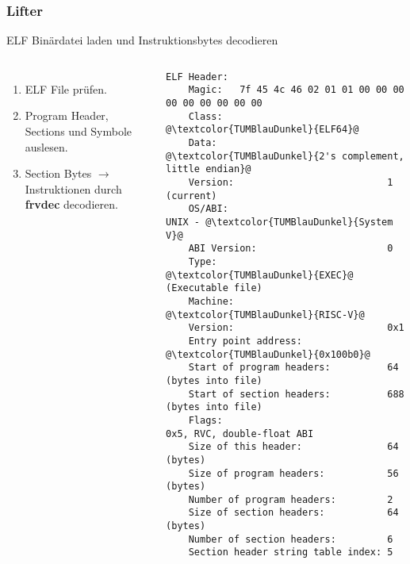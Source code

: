 
\begin{frame}[fragile]
    \frametitle{Lifter}{ELF Binärdatei laden und Instruktionsbytes decodieren}
    \begin{columns}[c]
        \pause{}
        \begin{enumerate}
            \item ELF File prüfen.
            \item Program Header, Sections und Symbole auslesen.
            \item Section Bytes $\rightarrow$ Instruktionen durch \textbf{frvdec} decodieren.
        \end{enumerate}
        \begin{lstlisting}[basicstyle=\footnotesize, breaklines=true, escapeinside={@@}]
ELF Header:
    Magic:   7f 45 4c 46 02 01 01 00 00 00 00 00 00 00 00 00
    Class:                             @\textcolor{TUMBlauDunkel}{ELF64}@
    Data:                              @\textcolor{TUMBlauDunkel}{2's complement, little endian}@
    Version:                           1 (current)
    OS/ABI:                            UNIX - @\textcolor{TUMBlauDunkel}{System V}@
    ABI Version:                       0
    Type:                              @\textcolor{TUMBlauDunkel}{EXEC}@ (Executable file)
    Machine:                           @\textcolor{TUMBlauDunkel}{RISC-V}@
    Version:                           0x1
    Entry point address:               @\textcolor{TUMBlauDunkel}{0x100b0}@
    Start of program headers:          64 (bytes into file)
    Start of section headers:          688 (bytes into file)
    Flags:                             0x5, RVC, double-float ABI
    Size of this header:               64 (bytes)
    Size of program headers:           56 (bytes)
    Number of program headers:         2
    Size of section headers:           64 (bytes)
    Number of section headers:         6
    Section header string table index: 5
        \end{lstlisting}
    \end{columns}
\end{frame}
\clearpage

